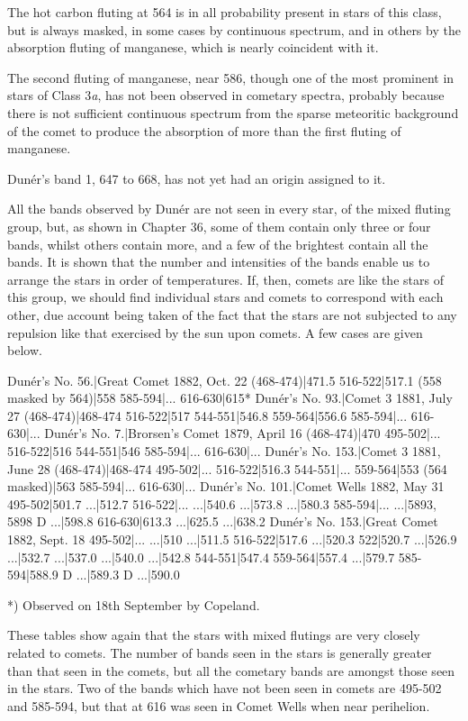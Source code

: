 \documentclass[a4paper, 12pt, oneside, polutonikogreek, english]{article}
\begin{document}
The hot carbon fluting at 564 is in all probability present in stars of this class, but is always masked, in some cases by continuous spectrum, and in others by the absorption fluting of manganese, which is nearly coincident with it.

The second fluting of manganese, near 586, though one of the most prominent in stars of Class 3\emph{a}, has not been observed in cometary spectra, probably because there is not sufficient continuous spectrum from the sparse meteoritic background of the comet to produce the absorption of more than the first fluting of manganese.

Dunér's band 1, 647 to 668, has not yet had an origin assigned to it.

All the bands observed by Dunér are not seen in every star, of the mixed fluting group, but, as shown in Chapter 36, some of them contain only three or four bands, whilst others contain more, and a few of the brightest contain all the bands. It is shown that the number and intensities of the bands enable us to arrange the stars in order of temperatures. If, then, comets are like the stars of this group, we should find individual stars and comets to correspond with each other, due account being taken of the fact that the stars are not subjected to any repulsion like that exercised by the sun upon comets. A few cases are given below.

Dunér's No. 56.|Great Comet 1882, Oct. 22 
(468-474)|471.5 
516-522|517.1 
(558 masked by 564)|558 
585-594|... 
616-630|615* 
Dunér's No. 93.|Comet 3 1881, July 27 
(468-474)|468-474 
516-522|517 
544-551|546.8 
559-564|556.6 
585-594|... 
616-630|... 
Dunér's No. 7.|Brorsen's Comet 1879, April 16 
(468-474)|470 
495-502|... 
516-522|516 
544-551|546 
585-594|... 
616-630|... 
Dunér's No. 153.|Comet 3 1881, June 28 
(468-474)|468-474 
495-502|... 
516-522|516.3 
544-551|... 
559-564|553 
(564 masked)|563 
585-594|... 
616-630|... 
Dunér's No. 101.|Comet Wells 1882, May 31 
495-502|501.7 
...|512.7 
516-522|... 
...|540.6 
...|573.8 
...|580.3 
585-594|... 
...|{5893, 5898} D 
...|598.8 
616-630|613.3 
...|625.5 
...|638.2 
Dunér's No. 153.|Great Comet 1882, Sept. 18 
495-502|... 
...|510 
...|511.5 
516-522|517.6 
...|520.3 
522|520.7 
...|526.9 
...|532.7 
...|537.0 
...|540.0 
...|542.8 
544-551|547.4 
559-564|557.4 
...|579.7 
585-594|588.9 D 
...|589.3 D 
...|590.0 

*) Observed on 18th September by Copeland.

These tables show again that the stars with mixed flutings are very closely related to comets. The number of bands seen in the stars is generally greater than that seen in the comets, but all the cometary bands are amongst those seen in the stars. Two of the bands which have not been seen in comets are 495-502 and 585-594, but that at 616 was seen in Comet Wells when near perihelion.
\end{document}
